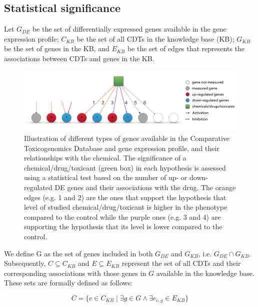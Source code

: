 \documentclass[Minh_PhD_thesis.tex]{subfiles}
\begin{document}
\subsection{Statistical significance}


Let $G_{DE}$ be the set of differentially expressed genes available in the gene expression profile; $C_{KB}$ be the set of all CDTs in the knowledge base (KB); $G_{KB}$ be the set of genes in the KB, and $E_{KB}$ be the set of edges that represents the associations between CDTs and genes in the KB. 

\begin{figure}
\centering
  \includegraphics[width=1\linewidth]{../Figures/SecondEvidence.pdf}
  \caption{Illustration of different types of genes available in the Comparative Toxicogenomics Database and gene expression profile, and their relationships with the chemical. The significance of a chemical/drug/toxicant (green box) in each hypothesis is assessed using a statistical test based on the number of up- or down-regulated DE genes and their associations with the drug. The orange edges (e.g. 1 and 2) are the ones that support the hypothesis that level of studied chemical/drug/toxicant is higher in the phenotype compared to the control while the purple ones (e.g. 3 and 4) are supporting the hypothesis that its level is lower compared to the control.}
  \label{fig:SignificantDrug}
\end{figure}

We define G as  the set of genes included in both $G_{DE}$ and $G_{KB}$, i.e.  $G_{DE} \cap G_{KB}$. Subsequently, $C \subseteq C_{KB}$  and $E \subseteq E_{KB}$ represent the set of all CDTs and their corresponding associations with those genes in $G$ available in the knowledge base. These sets are formally defined as follows:

\begin{equation}C = \{c \in C_{KB} \mid \exists g \in G \land \exists e_{c,g} \in E_{KB} \}\end{equation}
\end{document}
